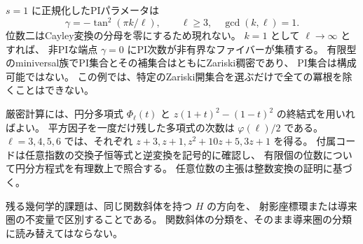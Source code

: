 $s=1$ に正規化したPIパラメータは
\[
 \gamma=-\tan^2(\pi k/\ell),\qquad
 \ell\ge3,\quad\gcd(k,\ell)=1.
\]
位数二はCayley変換の分母を零にするため現れない。
$k=1$ として $\ell\to\infty$ とすれば、
非PIな端点 $\gamma=0$ にPI次数が非有界なファイバーが集積する。
有限型のminiversal族でPI集合とその補集合はともにZariski稠密であり、
PI集合は構成可能ではない。
この例では、特定のZariski開集合を選ぶだけで全ての冪根を除くことはできない。

厳密計算には、円分多項式 $\Phi_\ell(t)$ と
$z(1+t)^2-(1-t)^2$ の終結式を用いればよい。
平方因子を一度だけ残した多項式の次数は $\varphi(\ell)/2$ である。
$\ell=3,4,5,6$ では、それぞれ
$z+3,z+1,z^2+10z+5,3z+1$ を得る。
付属コードは任意指数の交換子恒等式と逆変換を記号的に確認し、
有限個の位数について円分方程式を有理数上で照合する。
任意位数の主張は整数変換の証明に基づく。

残る幾何学的課題は、同じ関数斜体を持つ $H$ の方向を、
射影座標環または導来圏の不変量で区別することである。
関数斜体の分類を、そのまま導来圏の分類に読み替えてはならない。
